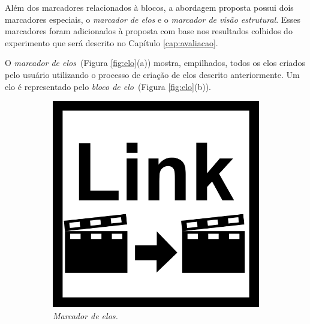 \documentclass[../main.tex]{subfiles}
\begin{document}
Além dos marcadores relacionados à blocos, a abordagem proposta possui dois marcadores especiais, o \emph{marcador de elos} e o \emph{marcador de visão estrutural}. Esses marcadores foram adicionados à proposta com base nos resultados colhidos do experimento que será descrito no Capítulo \ref{cap:avaliacao}.

O \emph{marcador de elos}~(Figura \ref{fig:elo}(a)) mostra, empilhados, todos os elos criados pelo usuário utilizando o processo de criação de elos descrito anteriormente. Um elo é representado pelo \emph{bloco de elo}~(Figura \ref{fig:elo}(b)). 

\begin{figure}[!h]
\centering
  \begin{subfigure}{0.3\linewidth}
  \centering
  \label{subfig:elo_marker}
    \includegraphics[width=1\linewidth]{IMG/Marcadores/link.png}
    \caption{\textit{Marcador de elos.}}
  \end{subfigure}
  \begin{subfigure}{0.3\linewidth}
  \centering
  \label{subfig:elo_bloco}

\end{subfigure}
\end{figure}
\end{document}

